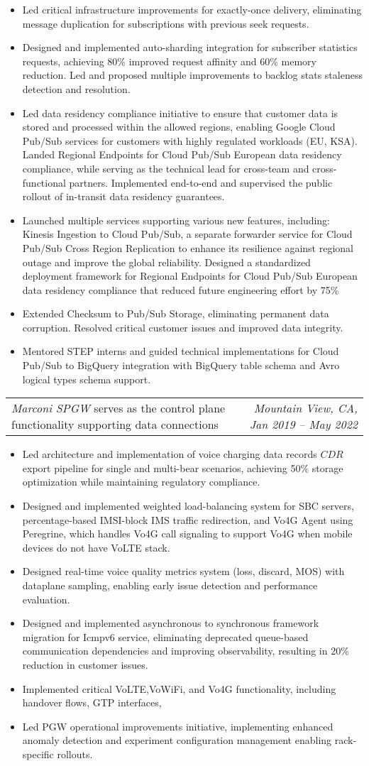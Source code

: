 \documentclass[letterpaper,11pt]{article}
\makeatletter
\newcommand{\resumeItem}[1]{
  \item\small{
    {#1 \vspace{-2pt}}
  }
}
\newcommand{\resumeSubSubheadingMultiteam}[4]{
    \begin{tabular*}{0.97\textwidth}{l@{\extracolsep{\fill}}r}
      \textit{\small#1}{ \scriptsize #4} & \textit{\small #2, #3} \\
    \end{tabular*}
    
    \vspace{-10pt}
}
\newcommand{\resumeItemListStart}{\begin{itemize}}
\newcommand{\resumeItemListEnd}{\end{itemize}\vspace{-5pt}}
\makeatother
\begin{document}
      \resumeItemListStart
\resumeItem{Led critical infrastructure improvements for exactly-once delivery, eliminating message duplication for subscriptions with previous seek requests.}
\resumeItem{Designed and implemented auto-sharding integration for subscriber statistics requests, achieving 80\% improved request affinity and 60\% memory reduction. Led and proposed multiple improvements to backlog stats staleness detection and resolution.}
\resumeItem{Led data residency compliance initiative to ensure that customer data is stored and processed within the allowed regions, enabling Google Cloud Pub/Sub services for customers with highly regulated workloads (EU, KSA). Landed Regional Endpoints for Cloud Pub/Sub European data residency compliance, while serving as the technical lead for cross-team and cross-functional partners. Implemented end-to-end and supervised the public rollout of in-transit data residency guarantees.}
\resumeItem{Launched multiple services supporting various new features, including: Kinesis Ingestion to Cloud Pub/Sub, a separate forwarder service for Cloud Pub/Sub Cross Region Replication to enhance its resilience against regional outage and improve the global reliability. Designed a standardized deployment framework for Regional Endpoints for Cloud Pub/Sub European data residency compliance that reduced future engineering effort by 75\%}
\resumeItem{Extended Checksum to Pub/Sub Storage, eliminating permanent data corruption. Resolved critical customer issues and improved data integrity.}
\resumeItem{Mentored STEP interns and guided technical implementations for Cloud Pub/Sub to BigQuery integration with BigQuery table schema and Avro logical types schema support.}
      \resumeItemListEnd


  \resumeSubSubheadingMultiteam
   {Marconi SPGW}{Mountain View, CA}{Jan 2019 -- May 2022}
   {serves as the control plane functionality supporting data connections}

      \resumeItemListStart
\resumeItem{Led architecture and implementation of voice charging data records \(CDR\) export pipeline for single and multi-bear scenarios, achieving 50\% storage optimization while maintaining regulatory compliance.}
\resumeItem{Designed and implemented weighted load-balancing system for SBC servers, percentage-based IMSI-block IMS traffic redirection, and Vo4G Agent using Peregrine, which handles Vo4G call signaling to support Vo4G when mobile devices do not have VoLTE stack.}
\resumeItem{Designed real-time voice quality metrics system (loss, discard, MOS) with dataplane sampling, enabling early issue detection and performance evaluation.}
\resumeItem{Designed and implemented asynchronous to synchronous framework migration for Icmpv6 service, eliminating deprecated queue-based communication dependencies and improving observability, resulting in 20\% reduction in customer issues.}
\resumeItem{Implemented critical VoLTE,VoWiFi, and Vo4G functionality, including handover flows, GTP interfaces, }
\resumeItem{Led PGW operational improvements initiative, implementing enhanced anomaly detection and experiment configuration management enabling rack-specific rollouts.}
      \resumeItemListEnd
\end{document}
